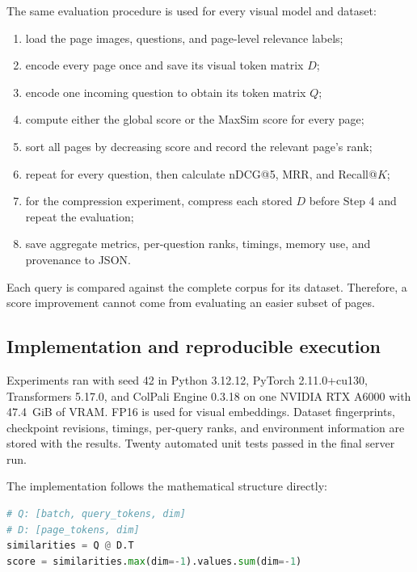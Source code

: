 \documentclass[11pt,a4paper]{article}
\begin{document}
The same evaluation procedure is used for every visual model and dataset:
\begin{enumerate}
  \item load the page images, questions, and page-level relevance labels;
  \item encode every page once and save its visual token matrix $D$;
  \item encode one incoming question to obtain its token matrix $Q$;
  \item compute either the global score or the MaxSim score for every page;
  \item sort all pages by decreasing score and record the relevant page's rank;
  \item repeat for every question, then calculate nDCG@5, MRR, and Recall@$K$;
  \item for the compression experiment, compress each stored $D$ before Step 4 and repeat the evaluation;
  \item save aggregate metrics, per-question ranks, timings, memory use, and provenance to JSON.
\end{enumerate}
Each query is compared against the complete corpus for its dataset. Therefore, a score improvement cannot come from evaluating an easier subset of pages.

\subsection{Implementation and reproducible execution}

Experiments ran with seed 42 in Python 3.12.12, PyTorch 2.11.0+cu130, Transformers 5.17.0, and ColPali Engine 0.3.18 on one NVIDIA RTX A6000 with 47.4~GiB of VRAM. FP16 is used for visual embeddings. Dataset fingerprints, checkpoint revisions, timings, per-query ranks, and environment information are stored with the results. Twenty automated unit tests passed in the final server run.

\begin{samepage}
The implementation follows the mathematical structure directly:
\begin{lstlisting}[language=Python,caption={Core late-interaction scorer (simplified from the project implementation).}]
# Q: [batch, query_tokens, dim]
# D: [page_tokens, dim]
similarities = Q @ D.T
score = similarities.max(dim=-1).values.sum(dim=-1)
\end{lstlisting}
\end{samepage}
\end{document}
